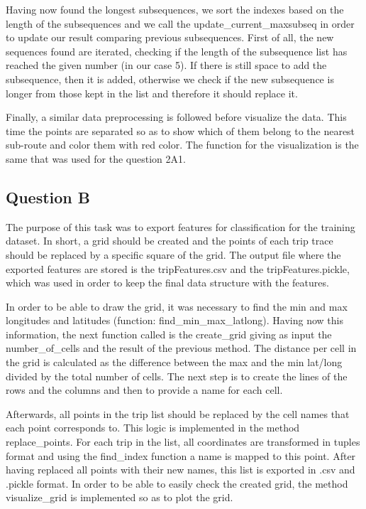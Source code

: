 \documentclass[12pt]{article}
\begin{document}
	Having now found the longest subsequences, we sort the indexes based on the length of the subsequences and we call the update\_current\_maxsubseq in order to update our result comparing previous subsequences. First of all, the new sequences found are iterated, checking if the length of the subsequence list has reached the given number (in our case 5). If there is still space to add the subsequence, then it is added, otherwise we check if the new subsequence is longer from those kept in the list and therefore it should replace it.
	
	Finally, a similar data preprocessing is followed before visualize the data. This time the points are separated so as to show which of them belong to the nearest sub-route and color them with red color. The function for the visualization is the same that was used for the question 2A1.
	
	\subsection{Question B}
	The purpose of this task was to export features for classification for the training dataset. In short, a grid should be created and the points of each trip trace should be replaced by a specific square of the grid. The output file where the exported features are stored is the tripFeatures.csv and the tripFeatures.pickle, which was used in order to keep the final data structure with the features.
	
	In order to be able to draw the grid, it was necessary to find the min and max longitudes and latitudes (function: find\_min\_max\_latlong). Having now this information, the next function called is the create\_grid giving as input the number\_of\_cells and the result of the previous method. The distance per cell in the grid is calculated as the difference between the max and the min lat/long divided by the total number of cells. The next step is to create the lines of the rows and the columns and then to provide a name for each cell.
	
	Afterwards, all points in the trip list should be replaced by the cell names that each point corresponds to. This logic is implemented in the method replace\_points. For each trip in the list, all coordinates are transformed in tuples format and using the find\_index function a name is mapped to this point. After having replaced all points with their new names, this list is exported in .csv and .pickle format. In order to be able to easily check the created grid, the method visualize\_grid is implemented so as to plot the grid. 
	
\end{document}
